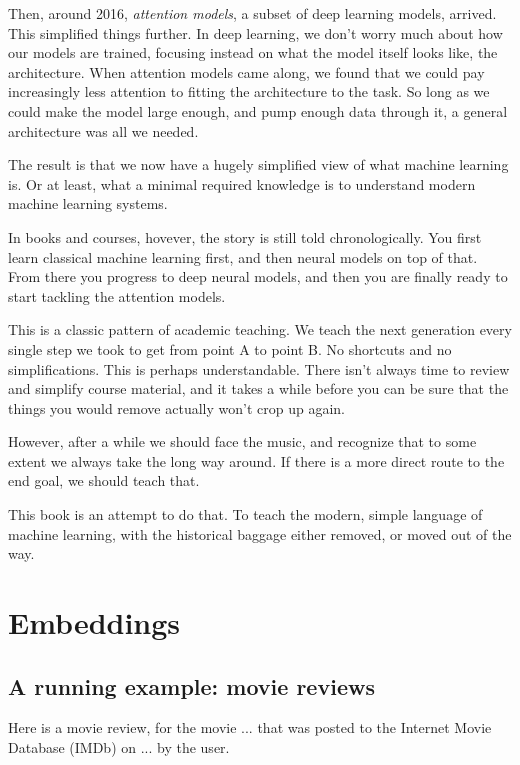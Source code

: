 \documentclass{pca}
\theoremstyle{theorem}
\theoremstyle{definition}
\theoremstyle{proof}
\begin{document}
Then, around 2016, \emph{attention models}, a subset of deep learning models, arrived. This simplified things further. In deep learning, we don't worry much about how our models are trained, focusing instead on what the model itself looks like, the architecture. When attention models came along, we found that we could pay increasingly less attention to fitting the architecture to the task. So long as we could make the model large enough, and pump enough data through it, a general architecture was all we needed.

The result is that we now have a hugely simplified view of what machine learning is. Or at least, what a minimal required knowledge is to understand modern machine learning systems. 

In books and courses, hovever, the story is still told chronologically. You first learn classical machine learning first, and then neural models on top of that. From there you progress to deep neural models, and then you are finally ready to start tackling the attention models.

This is a classic pattern of academic teaching. We teach the next generation every single step we took to get from point A to point B. No shortcuts and no simplifications. This is perhaps understandable. There isn't always time to review and simplify course material, and it takes a while before you can be sure that the things you would remove actually won't crop up again.

However, after a while we should face the music, and recognize that to some extent we always take the long way around. If there is a more direct route to the end goal, we should teach that. 

This book is an attempt to do that. To teach the modern, simple language of machine learning, with the historical baggage either removed, or moved out of the way. 


\chapter{Embeddings}


\section{A running example: movie reviews}

Here is a movie review, for the movie ... that was posted to the Internet Movie Database (IMDb) on ... by the user.
\end{document}
